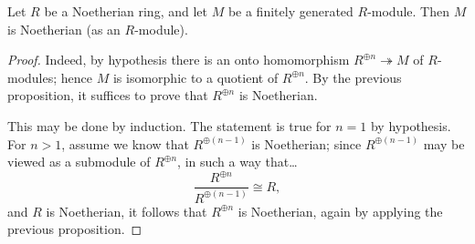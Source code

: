 \begin{corollary}
\label{finitegenmoduleisnoethermodule}
Let $R$ be a Noetherian ring, and let $M$ be a finitely generated $R$-module. Then $M$ is Noetherian (as an $R$-module).
\end{corollary}

\begin{proof}
Indeed, by hypothesis there is an onto homomorphism $R^{\oplus n} \twoheadrightarrow M$ of $R$-modules; hence $M$ is isomorphic
to a quotient of $R^{\oplus n}$. By the previous proposition, it suffices to prove that $R^{\oplus n}$ is Noetherian.

This may be done by induction. The statement is true for $n = 1$ by hypothesis. For $n > 1$, assume we know that $R^{\oplus(n-1)}$ is Noetherian;
since $R^{\oplus(n-1)}$ may be viewed as a submodule of $R^{\oplus n}$, in such a way that\dots
$$\frac{R^{\oplus n}}{R^{\oplus(n-1)}} \cong R,$$
and $R$ is Noetherian, it follows that $R^{\oplus n}$ is Noetherian, again by applying the previous proposition.
\end{proof}